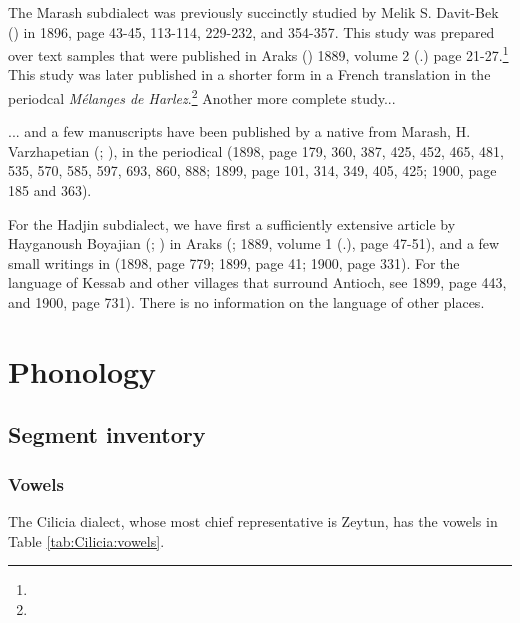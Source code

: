 The Marash subdialect was previously succinctly studied by Melik S. Davit-Bek () in  1896, page 43-45, 113-114, 229-232, and 354-357. This study was prepared over text samples that were published in Araks () 1889, volume 2 (.) page 21-27.\footnote{} This study was later published in a shorter form in a French translation in the periodcal \textit{Mélanges de Harlez}.\footnote{} Another more complete study... 

\begin{adjarianpage}\label{page:200}\end{adjarianpage}%

... and a few manuscripts have been published by a native from Marash, H. Varzhapetian (; ), in the periodical  (1898, page 179, 360, 387, 425, 452, 465, 481, 535, 570, 585, 597, 693, 860, 888; 1899, page 101, 314, 349, 405, 425; 1900, page 185 and 363). 

For the Hadjin subdialect, we have first a sufficiently extensive article by Hayganoush Boyajian (; ) in Araks (; 1889, volume 1 (.), page 47-51), and a few small writings in  (1898, page 779; 1899, page 41; 1900, page 331). For the language of Kessab and other villages that surround Antioch, see  1899, page 443, and 1900, page 731). There is no information on the language of other places. 

\section{Phonology}

\subsection{Segment inventory}
\subsubsection{Vowels}
The Cilicia dialect, whose most chief representative is Zeytun, has the vowels in Table \ref{tab:Cilicia:vowels}. 

